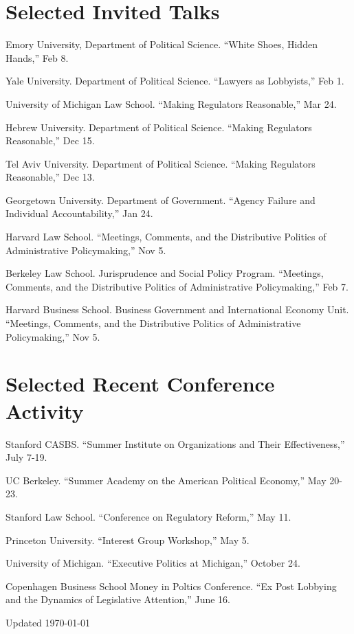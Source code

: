 \documentclass[12pt,letterpaper]{report}
\newcommand{\talk}[4]{\item[#1]{\tab{}#3. \enquote{#2,} #4.}} %
\begin{document}
    


\section*{Selected Invited Talks}

    \begin{tablist}
    \talk{2024}{White Shoes, Hidden Hands}{Emory University, Department of Political Science}{Feb 8}
    \talk{2023}{Lawyers as Lobbyists}{Yale University. Department of Political Science}{Feb 1}
	\talk{2022}{Making Regulators Reasonable}{University of Michigan Law School}{Mar 24}
	
    \talk{2021}{Making Regulators Reasonable}{Hebrew University. Department of Political Science}{Dec 15}
    	
	\talk{2021}{Making Regulators Reasonable}{Tel Aviv University. Department of Political Science}{Dec 13}
		
    \talk{2020}{Agency Failure and Individual Accountability}{Georgetown University. Department of Government}{Jan 24}

    \talk{2019}{Meetings, Comments, and the Distributive Politics of Administrative Policymaking}{Harvard Law School}{Nov 5}    
    \talk{2019}{Meetings, Comments, and the Distributive Politics of Administrative Policymaking}{Berkeley Law School. Jurisprudence and Social Policy Program}{Feb 7}    
    \talk{2019}{Meetings, Comments, and the Distributive Politics of Administrative Policymaking}{Harvard Business School. Business Government and International Economy Unit}{Nov 5}   
    
    \end{tablist}

\section*{Selected Recent Conference Activity}
    \begin{tablist}
    \talk{2024}{Summer Institute on Organizations and Their Effectiveness}{Stanford CASBS}{July 7-19}
    \talk{2024}{Summer Academy on the American Political Economy}{UC Berkeley}{May 20-23}
    \talk{2023}{Conference on Regulatory Reform}{Stanford Law School}{May 11}
    \talk{2023}{Interest Group Workshop}{Princeton University}{May 5}
	\talk{2022}{Executive Politics at Michigan}{University of Michigan}{October 24}
    \talk{2022}{Ex Post Lobbying and the Dynamics of Legislative Attention}{Copenhagen Business School Money in Poltics Conference}{June 16}

    \end{tablist}
    
    \begin{center}
        \vfill
        Updated \monthyeardate\today
    \end{center}
\end{document}
